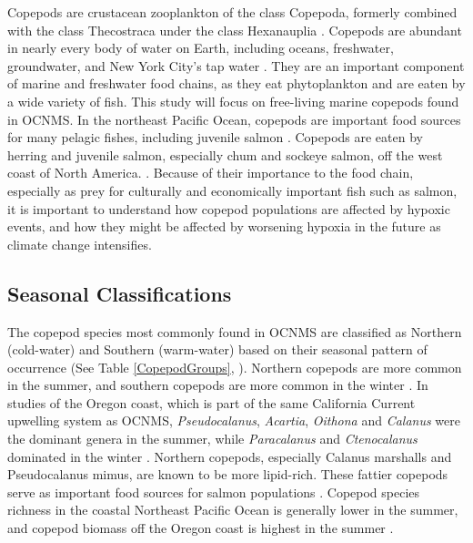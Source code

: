 \documentclass[12pt,twoside]{reedthesis}
\begin{document}
Copepods are crustacean zooplankton of the class Copepoda, formerly combined with the class Thecostraca under the class Hexanauplia \autocite{Oakley2013, Lozano-Fernandez2019}. Copepods are abundant in nearly every body of water on Earth, including oceans, freshwater, groundwater, and New York City's tap water \autocite{Vakati2023, Berger2004}. They are an important component of marine and freshwater food chains, as they eat phytoplankton and are eaten by a wide variety of fish. This study will focus on free-living marine copepods found in OCNMS. In the northeast Pacific Ocean, copepods are important food sources for many pelagic fishes, including juvenile salmon \autocite{Brodeur1990}. Copepods are eaten by herring and juvenile salmon, especially chum and sockeye salmon, off the west coast of North America. \autocite{Brodeur1990, Friedenberg2012}. Because of their importance to the food chain, especially as prey for culturally and economically important fish such as salmon, it is important to understand how copepod populations are affected by hypoxic events, and how they might be affected by worsening hypoxia in the future as climate change intensifies. 

\subsection{Seasonal Classifications}

The copepod species most commonly found in OCNMS are classified as Northern (cold-water) and Southern (warm-water) based on their seasonal pattern of occurrence (See Table \ref{CopepodGroups}, \autocite{NOAAFisheries2024, Peterson2003, Peterson1977}). Northern copepods are more common in the summer, and southern copepods are more common in the winter \autocite{NOAAFisheries2024}.  In studies of the Oregon coast, which is part of the same California Current upwelling system as OCNMS, \textit{Pseudocalanus}, \textit{Acartia}, \textit{Oithona} and \textit{Calanus} were the dominant genera in the summer, while \textit{Paracalanus} and \textit{Ctenocalanus} dominated in the winter \autocite{Peterson1977, Peterson2003}. Northern copepods, especially Calanus marshalls and Pseudocalanus mimus, are known to be more lipid-rich. These fattier copepods serve as important food sources for salmon populations \autocite{NOAAFisheries2024}. Copepod species richness in the coastal Northeast Pacific Ocean is generally lower in the summer, and copepod biomass off the Oregon coast is highest in the summer \autocite{Peterson2003}. 
\end{document}
